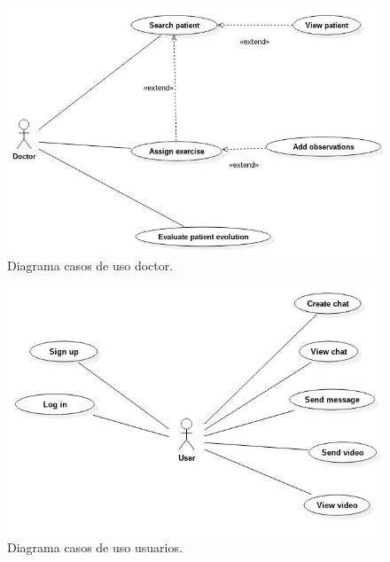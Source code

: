 \medskip
\begin{figure}
    \includegraphics[width=\linewidth]{./images/requisites/use-case-doctor.jpeg}
    \caption{Diagrama casos de uso doctor.}
    \label{Diagrama casos de uso doctor.}
\end{figure}

\medskip
\begin{figure}
    \includegraphics[width=\linewidth]{./images/requisites/use-case-user.jpeg}
    \caption{Diagrama casos de uso usuarios.}
    \label{Diagrama casos de uso usuarios.}
\end{figure}

